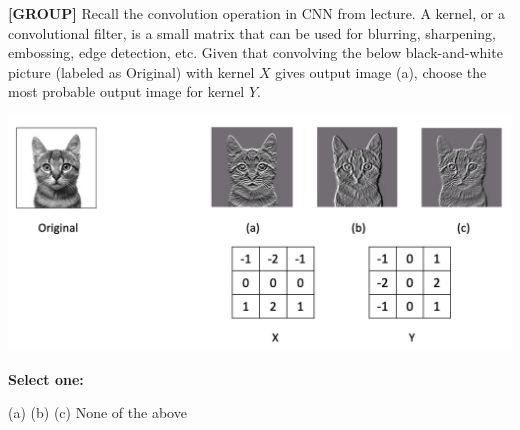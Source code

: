 \documentclass[11pt,addpoints,answers]{exam}
\newcommand{\group}{\textbf{[GROUP]} }
\begin{document}
\begin{questions}
    
    \question[3] \group Recall the convolution operation in CNN from lecture. A kernel, or a convolutional filter, is a small matrix that can be used for blurring, sharpening, embossing, edge detection, etc. Given that convolving the below black-and-white picture (labeled as Original) with kernel $X$ gives output image (a), choose the most probable output image for kernel $Y$.
    \begin{center}
        \includegraphics[scale=0.35]{figs/kernel.png}
    \end{center}
    \textbf{Select one:}
    \begin{checkboxes}
        \choice (a)
        \CorrectChoice (b)
        \choice (c)
        \choice None of the above
    \end{checkboxes}
    
    
\end{questions}




\clearpage
\end{document}
